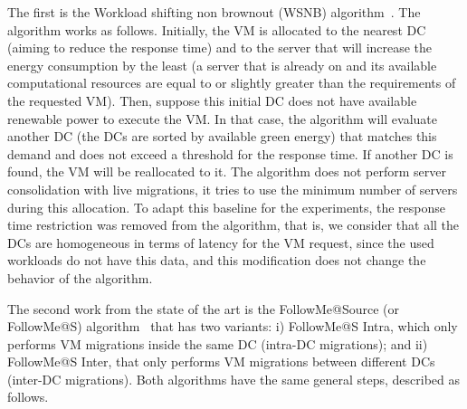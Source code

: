 The first is the Workload shifting non brownout (WSNB) algorithm~\cite{XU2020191}. The algorithm works as follows. Initially, the VM is allocated to the nearest DC (aiming to reduce the response time) and to the server that will increase the energy consumption by the least (a server that is already on and its available computational resources are equal to or slightly greater than the requirements of the requested VM). Then, suppose this initial DC does not have available renewable power to execute the VM. In that case, the algorithm will evaluate another DC (the DCs are sorted by available green energy) that matches this demand and does not exceed a threshold for the response time. If another DC is found, the VM will be reallocated to it. The algorithm does not perform server consolidation with live migrations, it tries to use the minimum number of servers during this allocation. To adapt this baseline for the experiments, the response time restriction was removed from the algorithm, that is, we consider that all the DCs are homogeneous in terms of latency for the VM request, since the used workloads do not have this data, and this modification does not change the behavior of the algorithm.


The second work from the state of the art is the FollowMe@Source (or FollowMe@S) algorithm~\cite{ALI2021110907} that has two variants: i) FollowMe@S Intra, which only performs VM migrations inside the same DC (intra-DC migrations);  and ii) FollowMe@S Inter, that only performs VM migrations between different DCs (inter-DC migrations). Both algorithms have the same general steps, described as follows.

